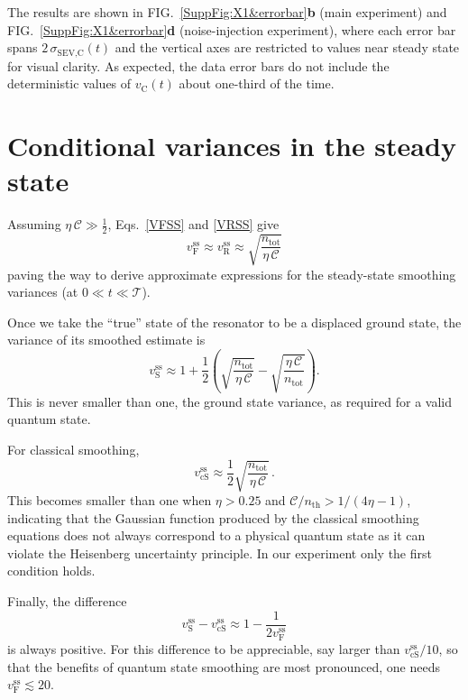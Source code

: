\documentclass[aps,prx,onecolumn,superscriptaddress,floatfix,longbibliography,amsmath,amssymb]{revtex4-2}
\begin{document}
The results are shown in FIG.~\ref{SuppFig:X1&errorbar}\textbf{b} (main experiment) and FIG.~\ref{SuppFig:X1&errorbar}\textbf{d} (noise-injection experiment), where each error bar spans $2\,\sigma_\text{SEV,C}(t)$ and the vertical axes are restricted to values near steady state for visual clarity. As expected, the data error bars do not include the deterministic values of $v_\text{C}(t)$ about one-third of the time.

\section{Conditional variances in the steady state}\label{sec:SSvariances}
Assuming $\eta\,\mathcal{C}\gg\tfrac{1}{2}$, Eqs.~\eqref{VFSS} and \eqref{VRSS} give
\begin{equation}
v_\text{F}^\text{ss}\approx v_\text{R}^\text{ss}\approx \sqrt{\frac{n_\text{tot}}{\eta\,\mathcal{C}}}
\end{equation}
paving the way to derive approximate expressions for the steady-state smoothing variances (at $0\ll t\ll\mathcal{T}$).

Once we take the ``true'' state of the resonator to be a displaced ground state, the variance of its smoothed estimate is
\begin{equation}
    v_\text{S}^\text{ss}\approx 1+\frac{1}{2}\!\left(\sqrt{\frac{n_\text{tot}}{\eta\,\mathcal{C}}}-\sqrt{\frac{\eta\,\mathcal{C}}{n_\text{tot}}}\right).
\end{equation}
This is never smaller than one, the ground state variance, as required for a valid quantum state.

For classical smoothing,
\begin{equation}
v_\text{cS}^\text{ss}\approx \frac{1}{2}\sqrt{\frac{n_\text{tot}}{\eta\,\mathcal{C}}}\,.
\end{equation}
This becomes smaller than one when $\eta>0.25$ and $\mathcal{C}/n_\text{th}>1/(4\eta-1)$, indicating that the Gaussian function produced by the classical smoothing equations does not always correspond to a physical quantum state as it can violate the Heisenberg uncertainty principle. In our experiment only the first condition holds.

Finally, the difference
\begin{equation}
v_\text{S}^\text{ss}-v_\text{cS}^\text{ss}\approx 1-\frac{1}{2v_\text{F}^\text{ss}}
\end{equation}
is always positive. For this difference to be appreciable, say larger than $v_\text{cS}^\text{ss}/10$, so that the benefits of quantum state smoothing are most pronounced, one needs $v_\text{F}^\text{ss}\lesssim 20$.
\end{document}

